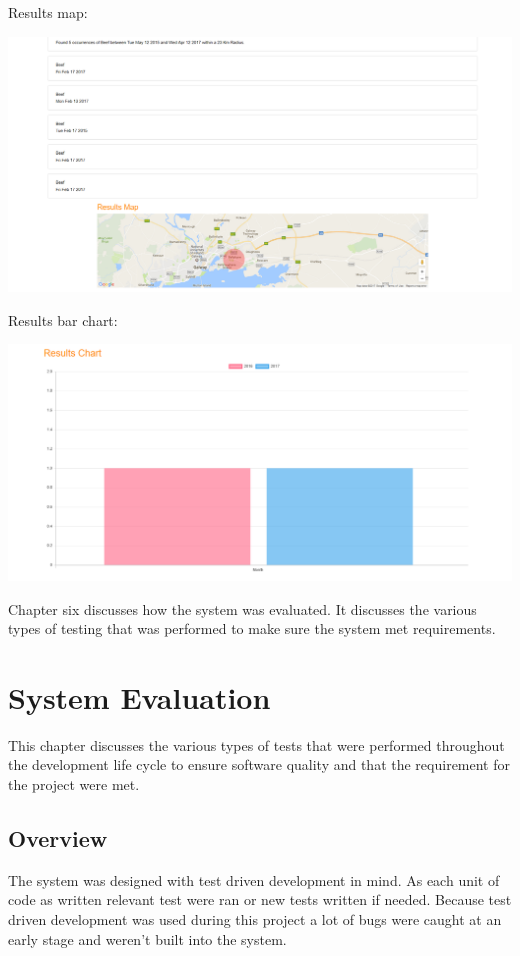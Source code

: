Results map:
\begin{center}    
    \includegraphics[width=140mm]{img/web/trendres.png}
\end{center}

Results bar chart:
\begin{center}    
    \includegraphics[width=140mm]{img/web/yearly.png}
\end{center}

Chapter six discusses how the system was evaluated. It discusses the various types of testing that was performed to make sure the system met requirements.

\chapter{System Evaluation}
This chapter discusses the various types of tests that were performed throughout the development life cycle to ensure software quality and that the requirement for the project were met.

\section{Overview}
The system was designed with test driven development in mind. As each unit of code as written relevant test were ran or new tests written if needed. Because test driven development was used during this project a lot of bugs were caught at an early stage and weren't built into the system. \\

